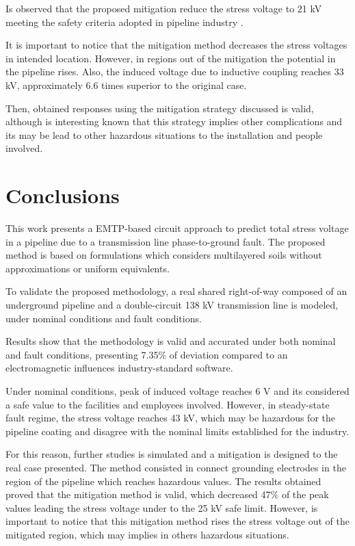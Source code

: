 \documentclass{IEEEtran4PSCC}
\begin{document}
Is observed that the proposed mitigation reduce the stress voltage to 21 kV meeting the safety criteria adopted in pipeline industry \cite{NACEInternational2007}. 

It is important to notice that the mitigation method decreases the stress voltages in intended location. However, in regions out of the mitigation the potential in the pipeline rises. Also, the induced voltage due to inductive coupling reaches 33 kV, approximately 6.6 times superior to the original case.

Then, obtained responses using the mitigation strategy discussed is valid, although is interesting known that this strategy implies other complications and its may be lead to other hazardous situations to the installation and people involved.

\section{Conclusions}

This work presents a EMTP-based circuit approach to predict total stress voltage in a pipeline due to a transmission line phase-to-ground fault. The proposed method is based on formulations which considers multilayered soils without approximations or uniform equivalents. 

To validate the proposed methodology, a real shared right-of-way composed of an underground pipeline and a double-circuit 138 kV transmission line is modeled, under nominal conditions and fault conditions. 

Results show that the methodology is valid and accurated under both nominal and fault conditions, presenting 7.35\% of deviation compared to an electromagnetic influences industry-standard software.

Under nominal conditions, peak of induced voltage reaches 6 V and its considered a safe value to the facilities and employees involved. However, in steady-state fault regime, the stress voltage reaches 43 kV, which may be hazardous for the pipeline coating and disagree with the nominal limits established for the industry. 

For this reason, further studies is simulated and a mitigation is designed to the real case presented. The method consisted in connect grounding electrodes in the region of the pipeline which reaches hazardous values. The results obtained proved that the mitigation method is valid, which decreased 47\% of the peak values leading the stress voltage under to the 25 kV safe limit. However, is important to notice that this mitigation method rises the stress voltage out of the mitigated region, which may implies in others hazardous situations.        


\nocite{*}

\end{document}
